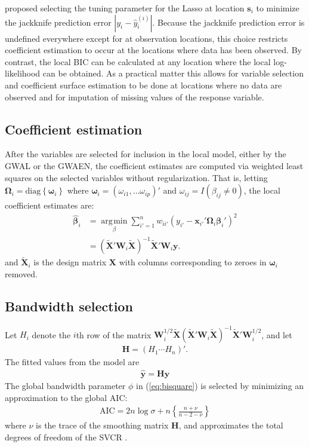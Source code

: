 \documentclass[authoryear, review, 11pt]{elsarticle}
\DeclareMathOperator*{\argmin}{\arg\!\min}
\begin{document}
	\cite{Wheeler:2009} proposed selecting the tuning parameter for the Lasso at location $\bm{s}_i$ to minimize the jackknife prediction error $|y_i - \hat{y}_i^{(i)}|$. Because the jackknife prediction error is undefined everywhere except for at observation locations, this choice restricts coefficient estimation to occur at the locations where data has been observed. By contrast, the local BIC can be calculated at any location where the local log-likelihood can be obtained. As a practical matter this allows for variable selection and coefficient surface estimation to be done at locations where no data are observed and for imputation of missing values of the response variable.
	
	\subsection{Coefficient estimation}
	After the variables are selected for inclusion in the local model, either by the GWAL or the GWAEN, the coefficient estimates are computed via weighted least squares on the selected variables without regularization. That is, letting $\bm{\Omega}_i = \text{diag}\left\{\bm{\omega}_i\right\}$ where $\bm{\omega}_i = \left(\omega_{i1}, \dots \omega_{ip}\right)'$ and $\omega_{ij}= I \left(\beta_{ij} \neq 0\right)$, the local coefficient estimates are:
	\begin{align} \label{eq:coefficients}
		\hat{\bm{\beta}}_i &= \argmin \limits_{\beta} \sum_{i'=1}^n w_{ii'} \left( y_{i'} - \bm{x}_{i'}' \bm{\Omega}_i \bm{\beta}_i' \right)^2\\
		&= \left( \tilde{\bm{X}}'\bm{W}_i \tilde{\bm{X}} \right)^{-1} \tilde{\bm{X}} '\bm{W}_i\bm{y}.
	\end{align}
	and $\tilde{\bm{X}}_i$ is the design matrix $\bm{X}$ with columns corresponding to zeroes in $\bm{\omega}_i$ removed.
	 
	\subsection{Bandwidth selection}
	Let $H_i$ denote the $i$th row of the matrix $\bm{W}_i^{1/2} \tilde{\bm{X}} \left( \tilde{\bm{X}}'\bm{W}_i \tilde{\bm{X}} \right)^{-1} \tilde{\bm{X}}'\bm{W}_i^{1/2}$, and let	
	\begin{align}
		\bm{H} = \left(H_1 \cdots H_n \right)'.
	\end{align}	
	The fitted values from the model are	
	\begin{align}
		\hat{\bm{y}} = \bm{H} \bm{y}
	\end{align}	
	The global bandwidth parameter $\phi$ in (\ref{eq:bisquare}) is selected by minimizing an approximation to the global AIC:	
	\begin{align}
		\text{AIC} = 2 n \log{\sigma} + n \left\{\frac{n + \nu}{n - 2 - \nu}\right\}
	\end{align}	
	where $\nu$ is the trace of the smoothing matrix $\bm{H}$, and approximates the total degrees of freedom of the SVCR \citep{Hurvich:1998}.
	
\end{document}
